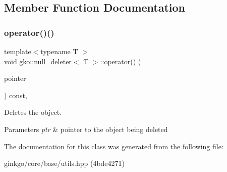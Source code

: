 \subsection{Member Function Documentation}
\mbox{\label{classgko_1_1null__deleter_a09fc153e500a30edaa572f2c6cb674ab}} 
\subsubsection{\texorpdfstring{operator()()}{operator()()}}
{\footnotesize\ttfamily template$<$typename T $>$ \\
void \hyperlink{classgko_1_1null__deleter}{gko\+::null\+\_\+deleter}$<$ T $>$\+::operator() (\begin{DoxyParamCaption}\item[{pointer}]{ }\end{DoxyParamCaption}) const\hspace{0.3cm}{\ttfamily [inline]}, {\ttfamily [noexcept]}}



Deletes the object. 


\begin{DoxyParams}{Parameters}
{\em ptr} & pointer to the object being deleted \\
\hline
\end{DoxyParams}


The documentation for this class was generated from the following file\+:\begin{DoxyCompactItemize}
\item 
ginkgo/core/base/utils.\+hpp (4bde4271)\end{DoxyCompactItemize}
